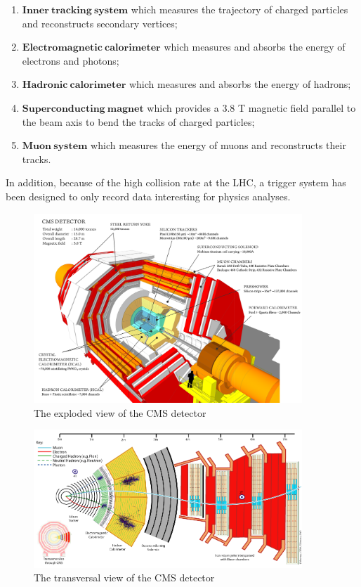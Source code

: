\begin{enumerate}
\item $\mathbf{Inner~tracking~system}$ which measures the trajectory of charged particles and reconstructs secondary vertices;
\item $\mathbf{Electromagnetic~calorimeter}$ which measures and absorbs the energy of electrons and photons;
\item $\mathbf{Hadronic~calorimeter}$ which measures and absorbs the energy of hadrons;
\item $\mathbf{Superconducting~magnet}$ which provides a 3.8 T magnetic field parallel to the beam axis to bend the tracks of charged particles;
\item $\mathbf{Muon~system}$ which measures the energy of muons and reconstructs their tracks.
\end{enumerate}
In addition, because of the high collision rate at the LHC, a trigger system has been designed to only record data interesting for physics analyses.

\begin{figure}[h!]
\begin{center}
\includegraphics[width=0.9\textwidth]{figures/CMS/cms.png}
\caption{The exploded view of the CMS detector}
\label{fig:CMS_overview}
\end{center}
\end{figure}

\begin{figure}[h!]
\begin{center}
\includegraphics[width=0.9\textwidth]{figures/CMS/cms_particles.png}
\caption{The transversal view of the CMS detector}
\label{fig:CMS_transversal}
\end{center}
\end{figure}

